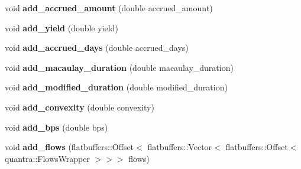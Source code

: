 \begin{DoxyCompactItemize}
\mbox{\label{structquantra_1_1FixedRateBondResponseBuilder_aca3203d7591be4b6870bfbbaaea64d10}} 
void {\bfseries add\+\_\+accrued\+\_\+amount} (double accrued\+\_\+amount)
\item 
\mbox{\label{structquantra_1_1FixedRateBondResponseBuilder_a4cfbef559b5859b3c1aa140ed1ddeee1}} 
void {\bfseries add\+\_\+yield} (double yield)
\item 
\mbox{\label{structquantra_1_1FixedRateBondResponseBuilder_a0c73e0b1a225612427b1c0fd0ae762ef}} 
void {\bfseries add\+\_\+accrued\+\_\+days} (double accrued\+\_\+days)
\item 
\mbox{\label{structquantra_1_1FixedRateBondResponseBuilder_a44e122311b2dd052e558fba65642bc79}} 
void {\bfseries add\+\_\+macaulay\+\_\+duration} (double macaulay\+\_\+duration)
\item 
\mbox{\label{structquantra_1_1FixedRateBondResponseBuilder_a3078638f6ac639f6fa3b952936420fd2}} 
void {\bfseries add\+\_\+modified\+\_\+duration} (double modified\+\_\+duration)
\item 
\mbox{\label{structquantra_1_1FixedRateBondResponseBuilder_a06475e4a933d653bbfcec17eab0ef7ad}} 
void {\bfseries add\+\_\+convexity} (double convexity)
\item 
\mbox{\label{structquantra_1_1FixedRateBondResponseBuilder_a9835cc69e13ffbab509db118c2d383ac}} 
void {\bfseries add\+\_\+bps} (double bps)
\item 
\mbox{\label{structquantra_1_1FixedRateBondResponseBuilder_a20ff7251a9c41fbbc05b3fa4770c1682}} 
void {\bfseries add\+\_\+flows} (flatbuffers\+::\+Offset$<$ flatbuffers\+::\+Vector$<$ flatbuffers\+::\+Offset$<$ quantra\+::\+Flows\+Wrapper $>$$>$$>$ flows)
\item 
\mbox{\label{structquantra_1_1FixedRateBondResponseBuilder_a0c6b61947b183f68ec0fb65453f47edd}} 

\end{DoxyCompactItemize}
